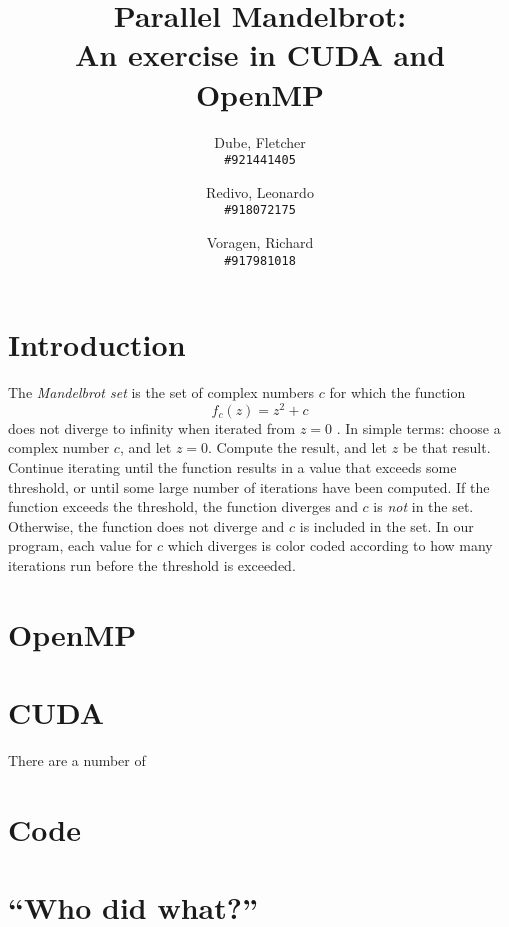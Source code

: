 \documentclass{article}
\author{
	Dube, Fletcher\\
	\texttt{\#921441405}
	\and
	Redivo, Leonardo\\
	\texttt{\#918072175}
	\and
	Voragen, Richard\\
	\texttt{\#917981018}
}
\title{Parallel Mandelbrot: \\An exercise in CUDA and OpenMP}
\begin{document}
\maketitle

\section{Introduction}
The \emph{Mandelbrot set} is the set of complex numbers $c$ for which the function $$f_c(z) = z^2 + c$$ does not diverge to infinity when iterated from $z = 0$ \cite{mandel_wiki}. In simple terms: choose a complex number $c$, and let $z = 0$. Compute the result, and let $z$ be that result. Continue iterating until the function results in a value that exceeds some threshold, or until some large number of iterations have been computed. If the function exceeds the threshold, the function diverges and $c$ is \emph{not} in the set. Otherwise, the function does not diverge and $c$ is included in the set. In our program, each value for $c$ which diverges is color coded according to how many iterations run before the threshold is exceeded.

\section{OpenMP}

\section{CUDA}
There are a number of 

\appendix
\section{Code}
\lstset{language=C,stringstyle=\ttfamily, showstringspaces=false, numbers=left, frame=single, framexrightmargin=0pt, columns=fullflexible, breaklines=true, breakatwhitespace=true}


\section{``Who did what?''}

 

\end{document}
